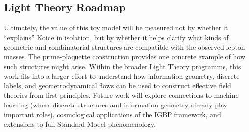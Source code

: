 \documentclass[12pt]{article}
\begin{document}
\subsection{Light Theory Roadmap}

Ultimately, the value of this toy model will be measured not by whether it
``explains'' Koide in isolation, but by whether it helps clarify what kinds of
geometric and combinatorial structures are compatible with the observed lepton
masses.  The prime-plaquette construction provides one concrete example of how
such structures might arise.  Within the broader Light Theory programme, this
work fits into a larger effort to understand how information geometry,
discrete labels, and geometrodynamical flows can be used to construct
effective field theories from first principles.  Future work will explore
connections to machine learning (where discrete structures and information
geometry already play important roles), cosmological applications of the IGBP
framework, and extensions to full Standard Model phenomenology.




\end{document}
